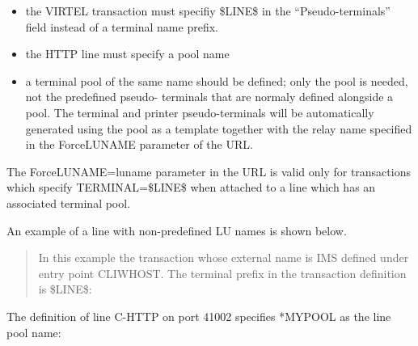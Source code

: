 \documentclass[letterpaper,10pt,english]{sphinxmanual}
\begin{document}
\begin{sphinxVerbatim}[commandchars=\\\{\}]
\end{sphinxVerbatim}
\begin{itemize}
\item {} 
the VIRTEL transaction must specifiy \$LINE\$ in the “Pseudo-terminals”
field instead of a terminal name prefix.

\item {} 
the HTTP line must specify a pool name

\item {} 
a terminal pool of the same name should be defined; only the pool is needed, not the predefined pseudo- terminals that are normaly defined alongside a pool. The terminal and printer pseudo-terminals will be automatically generated using the pool as a template together with the relay name specified in the ForceLUNAME parameter of the URL.

\end{itemize}

The ForceLUNAME=luname parameter in the URL is valid only for transactions which specify TERMINAL=\$LINE\$ when attached to a line which has an associated terminal pool.

An example of a line with non-predefined LU names is shown below.

\begin{quote}

In this example the transaction whose external name is IMS defined under entry point CLIWHOST. The terminal prefix in the transaction definition is \$LINE\$:
\end{quote}



The definition of line C-HTTP on port 41002 specifies *MYPOOL as the line pool name:


\end{document}
